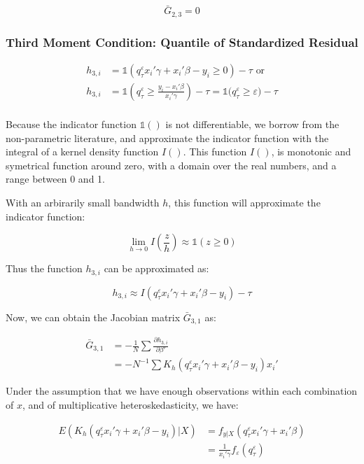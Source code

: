\documentclass[
  authoryear,
  preprint,
  1p]{elsarticle}
\begin{document}
\[\bar G_{2,3}=0\]

\hypertarget{third-moment-condition-quantile-of-standardized-residual}{%
\subsubsection{Third Moment Condition: Quantile of Standardized
Residual}\label{third-moment-condition-quantile-of-standardized-residual}}

\[\begin{aligned}
h_{3,i} &= \mathbb{1}\left( q^\varepsilon_\tau x_i'\gamma +x_i'\beta - y_i \geq 0 \right) - \tau \text{ or}\\
h_{3,i} &= \mathbb{1}\left( q^\varepsilon_\tau  \geq \frac{y_i- x_i'\beta}{x_i'\gamma}  \right) - \tau = \mathbb{1}\big( q^\varepsilon_\tau  \geq \varepsilon  \big) - \tau \\
\end{aligned}
\]

Because the indicator function \(\mathbb{1}()\) is not differentiable,
we borrow from the non-parametric literature, and approximate the
indicator function with the integral of a kernel density function
\(I()\). This function \(I()\), is monotonic and symetrical function
around zero, with a domain over the real numbers, and a range between 0
and 1.

With an arbirarily small bandwidth \(h\), this function will approximate
the indicator function:

\[
\lim_{h\rightarrow 0} I\left(\frac{z}{h}\right) \approx \mathbb{1}(z\geq 0)
\]

Thus the function \(h_{3,i}\) can be approximated as:

\[h_{3,i} \approx I\left( q^\varepsilon_\tau x_i'\gamma +x_i'\beta - y_i  \right) - \tau\]

Now, we can obtain the Jacobian matrix \(\bar G_{3,1}\) as:

\[\begin{aligned}
\bar G_{3,1} &= -\frac{1}{N} \sum \frac{\partial h_{3,i}}{\partial \beta'} \\
             &= -N^{-1} \sum K_h(q^\varepsilon_\tau x_i'\gamma +x_i'\beta - y_i ) x_i'
\end{aligned}
\]

Under the assumption that we have enough observations within each
combination of \(x\), and of multiplicative heteroskedasticity, we have:

\[\begin{aligned}
E(K_h(q^\varepsilon_\tau x_i'\gamma +x_i'\beta - y_i )|X) &= f_{y|X}(q^\varepsilon_\tau x_i'\gamma +x_i'\beta) \\
&=\frac{1}{x_i'\gamma} f_{\varepsilon}(q^\varepsilon_\tau) \\
\end{aligned}
\]
\end{document}
